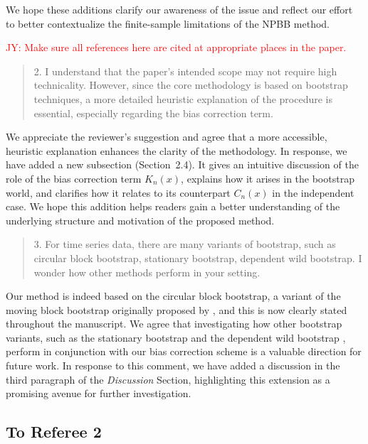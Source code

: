 \documentclass[12pt]{article}
\newcommand{\jy}[1]{\textcolor{red}{JY: #1}}
\newenvironment{comment}%
{\begin{quotation}\noindent\small\it\color{darkblue}\ignorespaces%
}{\end{quotation}}
\begin{document}
We hope these additions clarify our awareness of the issue and reflect 
our effort to better contextualize the finite-sample limitations of the 
NPBB method.


\jy{Make sure all references here are cited at appropriate places in the paper.}


\begin{comment}
2. I understand that the paper’s intended scope may not require high 
technicality. However,
since the core methodology is based on bootstrap techniques, a more detailed 
heuristic
explanation of the procedure is essential, especially regarding the bias 
correction term.
\end{comment}


We appreciate the reviewer’s suggestion and agree that a more accessible, 
heuristic explanation enhances the clarity of the methodology. In response, 
we have added a new subsection (Section~2.4). It gives an intuitive
discussion of the role of the bias correction term $ K_n(x)$, explains
how it arises in the bootstrap world, and clarifies how it relates to
its counterpart $C_n(x)$ in the independent case. We hope this
addition helps readers gain a better understanding of the underlying
structure and motivation of the proposed method.


\begin{comment}
3. For time series data, there are many variants of bootstrap, such as circular 
block bootstrap,
stationary bootstrap, dependent wild bootstrap. I wonder how other methods 
perform in
your setting.
\end{comment} 

Our method is indeed based on the circular block bootstrap, a variant
of the moving block bootstrap originally proposed by
\citet{romano1992circular}, and this is now clearly stated throughout
the manuscript. We agree that investigating how other bootstrap
variants, such as the stationary bootstrap
\citep{politis1994stationary} and the dependent wild
bootstrap \citep{shao2010dependent}, perform in conjunction with our
bias correction scheme is a valuable direction for future work. In
response to this comment, we have added a discussion in the third
paragraph of the \emph{Discussion} Section, highlighting this
extension as a promising avenue for further investigation.


\subsection*{To Referee 2}
\end{document}
